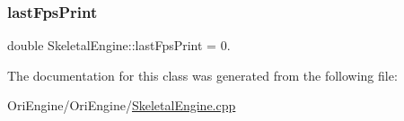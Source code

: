 \subsubsection{\texorpdfstring{last\+Fps\+Print}{lastFpsPrint}}
{\footnotesize\ttfamily double Skeletal\+Engine\+::last\+Fps\+Print = 0.\hspace{0.3cm}{\ttfamily [private]}}



The documentation for this class was generated from the following file\+:\begin{DoxyCompactItemize}
\item 
Ori\+Engine/\+Ori\+Engine/\hyperlink{_skeletal_engine_8cpp}{Skeletal\+Engine.\+cpp}\end{DoxyCompactItemize}
